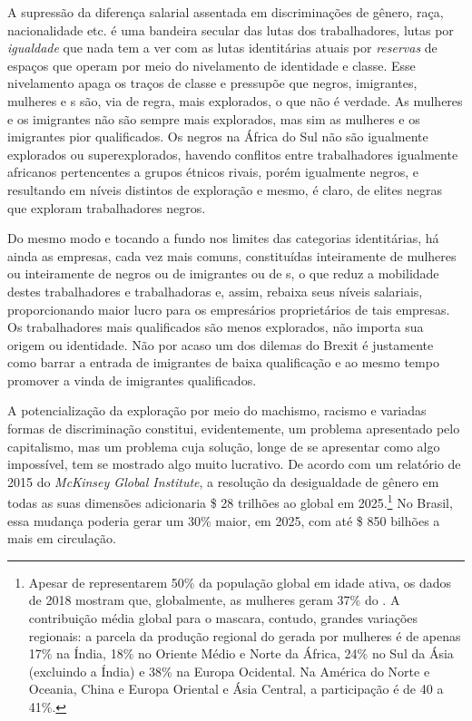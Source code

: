 A supressão da diferença salarial assentada em discriminações de gênero,
raça, nacionalidade etc. é uma bandeira secular das lutas dos
trabalhadores, lutas por \emph{igualdade} que nada tem a ver com as
lutas identitárias atuais por \emph{reservas} de espaços que operam por
meio do nivelamento de identidade e classe. Esse nivelamento apaga os
traços de classe e pressupõe que negros, imigrantes, mulheres e s
são, via de regra, mais explorados, o que não é verdade. As mulheres e
os imigrantes não são sempre mais explorados, mas sim as mulheres e os
imigrantes pior qualificados. Os negros na África do Sul não são
igualmente explorados ou superexplorados, havendo conflitos entre
trabalhadores igualmente africanos pertencentes a grupos étnicos rivais,
porém igualmente negros, e resultando em níveis distintos de exploração
e mesmo, é claro, de elites negras que exploram trabalhadores negros.

Do mesmo modo e tocando a fundo nos limites das categorias identitárias,
há ainda as empresas, cada vez mais comuns, constituídas inteiramente de
mulheres ou inteiramente de negros ou de imigrantes ou de s, o que
reduz a mobilidade destes trabalhadores e trabalhadoras e, assim,
rebaixa seus níveis salariais, proporcionando maior lucro para os
empresários proprietários de tais empresas. Os trabalhadores mais
qualificados são menos explorados, não importa sua origem ou identidade.
Não por acaso um dos dilemas do Brexit é justamente como barrar a
entrada de imigrantes de baixa qualificação e ao mesmo tempo promover a
vinda de imigrantes qualificados.

A potencialização da exploração por meio do machismo, racismo e variadas
formas de discriminação constitui, evidentemente, um problema
apresentado pelo capitalismo, mas um problema cuja solução, longe de se
apresentar como algo impossível, tem se mostrado algo muito lucrativo.
De acordo com um relatório de 2015 do \emph{McKinsey Global Institute},
a resolução da desigualdade de gênero em todas as suas dimensões
adicionaria \$ 28 trilhões ao  global em 2025.\footnote{Apesar de
  representarem 50\% da população global em idade ativa, os dados de
  2018 mostram que, globalmente, as mulheres geram 37\% do . A
  contribuição média global para o  mascara, contudo, grandes
  variações regionais: a parcela da produção regional do  gerada por
  mulheres é de apenas 17\% na Índia, 18\% no Oriente Médio e Norte da
  África, 24\% no Sul da Ásia (excluindo a Índia) e 38\% na Europa
  Ocidental. Na América do Norte e Oceania, China e Europa Oriental e
  Ásia Central, a participação é de 40 a 41\%.} No Brasil, essa mudança
poderia gerar um  30\% maior, em 2025, com até \$ 850 bilhões a
mais em circulação.

